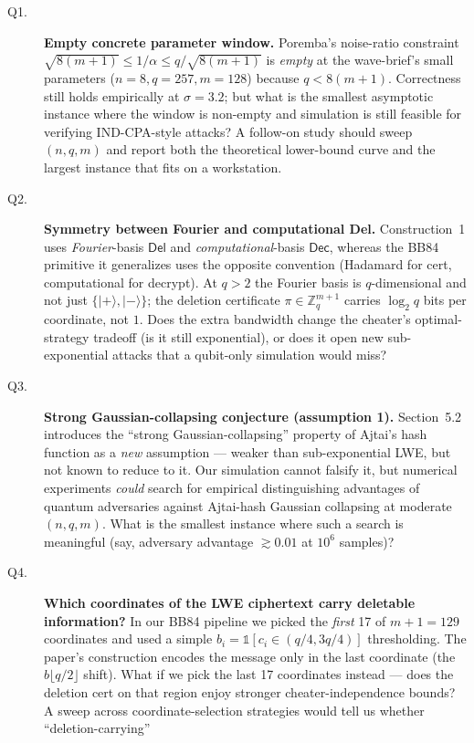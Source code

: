 \begin{description}
\item[Q1.] \textbf{Empty concrete parameter window.} Poremba's noise-ratio
constraint $\sqrt{8(m{+}1)}\le 1/\alpha \le q/\sqrt{8(m{+}1)}$ is
\emph{empty} at the wave-brief's small parameters ($n{=}8,q{=}257,m{=}128$)
because $q < 8(m{+}1)$. Correctness still holds empirically at
$\sigma{=}3.2$; but what is the smallest asymptotic instance where the
window is non-empty and simulation is still feasible for verifying
IND-CPA-style attacks? A follow-on study should sweep $(n, q, m)$ and
report both the theoretical lower-bound curve and the largest instance
that fits on a workstation.
\item[Q2.] \textbf{Symmetry between Fourier and computational Del.}
Construction~1 uses \emph{Fourier}-basis $\mathsf{Del}$ and
\emph{computational}-basis $\mathsf{Dec}$, whereas the BB84 primitive it
generalizes uses the opposite convention (Hadamard for cert, computational
for decrypt). At $q > 2$ the Fourier basis is $q$-dimensional and not just
$\{|+\rangle,|-\rangle\}$; the deletion certificate $\pi \in \mathbb{Z}_q^{m+1}$
carries $\log_2 q$ bits per coordinate, not $1$. Does the extra bandwidth
change the cheater's optimal-strategy tradeoff (is it still exponential),
or does it open new sub-exponential attacks that a qubit-only simulation
would miss?
\item[Q3.] \textbf{Strong Gaussian-collapsing conjecture (assumption 1).}
Section~5.2 introduces the ``strong Gaussian-collapsing'' property of
Ajtai's hash function as a \emph{new} assumption --- weaker than
sub-exponential LWE, but not known to reduce to it. Our simulation cannot
falsify it, but numerical experiments \emph{could} search for empirical
distinguishing advantages of quantum adversaries against Ajtai-hash
Gaussian collapsing at moderate $(n,q,m)$. What is the smallest instance
where such a search is meaningful (say, adversary advantage $\gtrsim 0.01$
at $10^6$ samples)?
\item[Q4.] \textbf{Which coordinates of the LWE ciphertext carry deletable
information?} In our BB84 pipeline we picked the \emph{first} 17 of $m{+}1=129$
coordinates and used a simple $b_i = \mathbb{1}[c_i \in (q/4, 3q/4)]$
thresholding. The paper's construction encodes the message only in the
last coordinate (the $b\lfloor q/2\rfloor$ shift). What if we pick the
last 17 coordinates instead --- does the deletion cert on that region
enjoy stronger cheater-independence bounds? A sweep across
coordinate-selection strategies would tell us whether ``deletion-carrying''

\end{description}

